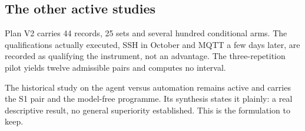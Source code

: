 \subsection{The other active studies}

Plan V2 carries 44 records, 25 sets and several hundred conditional arms. The
qualifications actually executed, SSH in October and MQTT a few days later, are
recorded as qualifying the instrument, not an advantage. The three-repetition pilot
yields twelve admissible pairs and computes no interval.

The historical study on the agent versus automation remains active and carries the
S1 pair and the model-free programme. Its synthesis states it plainly: a real
descriptive result, no general superiority established. This is the formulation to
keep.
